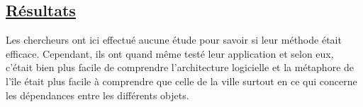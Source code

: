 \documentclass[a4paper,10pt, oneside]{article}
\begin{document}
\subsection{\ul{Résultats}}
        \par Les chercheurs ont ici effectué aucune étude pour savoir si leur méthode était efficace. Cependant, ils ont quand même testé leur application et 
        selon eux, c'était bien plus facile de comprendre l'architecture logicielle et la métaphore de l'île était plus facile à comprendre que celle de la ville surtout en ce qui
        concerne les dépendances entre les différents objets.
\newpage



\end{document}
